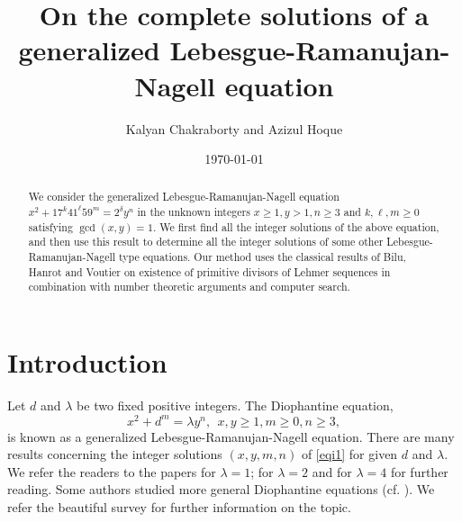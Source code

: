 \documentclass[12pt, 14paper,reqno]{amsart}
\theoremstyle{plain}
\theoremstyle{proof}
\numberwithin{equation}{section}
\begin{document}
 
\title[On a Lebesgue-Ramanujan-Nagell equation]{On the complete solutions of a generalized Lebesgue-Ramanujan-Nagell equation}
\author{Kalyan Chakraborty and Azizul Hoque}
\address{KC @Department of Mathematics, SRM University AP, Mangalagiri-Mandal, Guntur-522240, Andhra Pradesh, India}
\address{AH @Department of Mathematics, Faculty of Science, Rangapara College, Rangapara, Sonitpur-784505, Assam, India.}
\date{\today}
\maketitle

\begin{abstract}
We consider the generalized Lebesgue-Ramanujan-Nagell equation $x^2+17^k41^\ell 59^m=2^\delta y^n$ in the unknown integers $x\geq 1, y>1,n\geq 3$ and $k, \ell, m\geq 0$ satisfying $\gcd(x,y)=1$. We first find  all the integer solutions of the above equation, and then use this result to determine all the integer solutions of some other Lebesgue-Ramanujan-Nagell type equations. Our method uses the classical results of Bilu, Hanrot and Voutier on existence of primitive divisors of Lehmer sequences in combination with number theoretic arguments and computer search.
\end{abstract}
\section{Introduction}\label{S1}
Let $d$ and $\lambda$ be two fixed positive integers. The Diophantine equation, 
\begin{equation}\label{eqi1}
x^2+d^m=\lambda y^n,~~ x,y\geq 1, m\geq 0, n\geq 3,
\end{equation} 
is known as a generalized Lebesgue-Ramanujan-Nagell equation. There are many results concerning the integer solutions $(x, y, m, n)$ of \eqref{eqi1} for given $d$ and $\lambda$. We refer the readers to the papers \cite{AA02, BP12,CO03,P2013} for $\lambda=1$; \cite{AL09, ZL12} for $\lambda=2$ and \cite{BHS19, CHS20, LTT09} for $\lambda=4$ for further reading. Some authors studied more general Diophantine equations (cf. \cite{AAL02, BU01, CH22, CHS21, HO20, LE93}).  We refer the beautiful survey \cite{LS20} for further information on the topic. 
\end{document}
